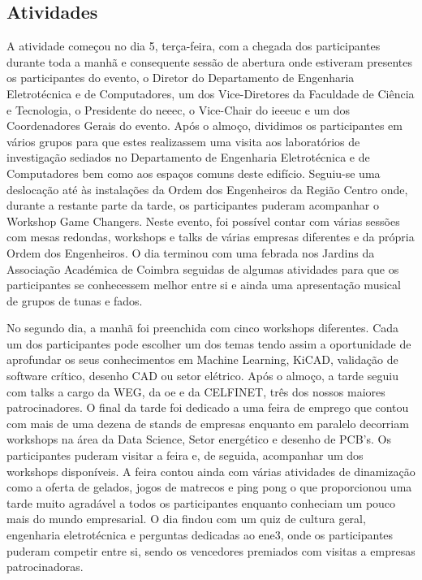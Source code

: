 \subsection{Atividades}

A atividade começou no dia 5, terça-feira, com a chegada dos participantes durante toda a manhã e consequente sessão de abertura onde estiveram presentes os participantes do evento, o Diretor do Departamento de Engenharia Eletrotécnica e de Computadores, um dos Vice-Diretores da Faculdade de Ciência e Tecnologia, o Presidente do \acrshort{neeec}, o Vice-Chair do \acrshort{ieeeuc} e um dos Coordenadores Gerais do evento. Após o almoço, dividimos os participantes em vários grupos para que estes realizassem uma visita aos laboratórios de investigação sediados no Departamento de Engenharia Eletrotécnica e de Computadores bem como aos espaços comuns deste edifício. Seguiu-se uma deslocação até às instalações da Ordem dos Engenheiros da Região Centro onde, durante a restante parte da tarde, os participantes puderam acompanhar o Workshop Game Changers. Neste evento, foi possível contar com várias sessões com mesas redondas, workshops e talks de várias empresas diferentes e da própria Ordem dos Engenheiros. O dia terminou com uma febrada nos Jardins da Associação Académica de Coimbra seguidas de algumas atividades para que os participantes se conhecessem melhor entre si e ainda uma apresentação musical de grupos de tunas e fados.

No segundo dia, a manhã foi preenchida com cinco workshops diferentes. Cada um dos participantes pode escolher um dos temas tendo assim a oportunidade de aprofundar os seus conhecimentos em Machine Learning, KiCAD, validação de software crítico, desenho CAD ou setor elétrico. Após o almoço, a tarde seguiu com talks a cargo da WEG, da \acrfull{oe} e da CELFINET, três dos nossos maiores patrocinadores. O final da tarde foi dedicado a uma feira de emprego que contou com mais de uma dezena de stands de empresas enquanto em paralelo decorriam workshops na área da Data Science, Setor energético e desenho de PCB’s. Os participantes puderam visitar a feira e, de seguida, acompanhar um dos workshops disponíveis. A feira contou ainda com várias atividades de dinamização como a oferta de gelados, jogos de matrecos e ping pong o que proporcionou uma tarde muito agradável a todos os participantes enquanto conheciam um pouco mais do mundo empresarial. O dia findou com um quiz de cultura geral, engenharia eletrotécnica e perguntas dedicadas ao \acrshort{ene3}, onde os participantes puderam competir entre si, sendo os vencedores premiados com visitas a empresas patrocinadoras.

